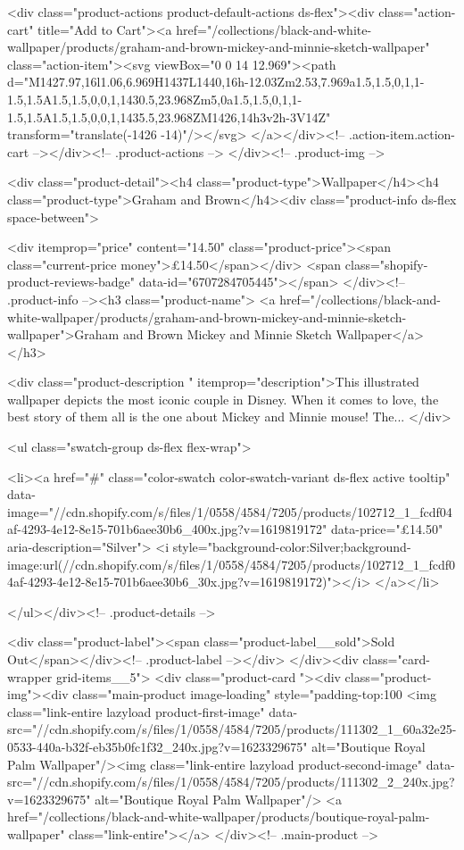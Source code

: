 {{{{{{{<div class="product-actions product-default-actions ds-flex"><div class="action-cart" title="Add to Cart"><a href="/collections/black-and-white-wallpaper/products/graham-and-brown-mickey-and-minnie-sketch-wallpaper" class="action-item"><svg viewBox="0 0 14 12.969"><path d="M1427.97,16l1.06,6.969H1437L1440,16h-12.03Zm2.53,7.969a1.5,1.5,0,1,1-1.5,1.5A1.5,1.5,0,0,1,1430.5,23.968Zm5,0a1.5,1.5,0,1,1-1.5,1.5A1.5,1.5,0,0,1,1435.5,23.968ZM1426,14h3v2h-3V14Z" transform="translate(-1426 -14)"/></svg>
</a></div><!-- .action-item.action-cart --></div><!-- .product-actions -->
</div><!-- .product-img -->

<div class="product-detail"><h4 class="product-type">Wallpaper</h4><h4 class="product-type">Graham and Brown</h4><div class="product-info ds-flex space-between">
    
<div itemprop="price" content="14.50" class="product-price"><span class="current-price money">£14.50</span></div>
    <span class="shopify-product-reviews-badge" data-id="6707284705445"></span>
  </div><!-- .product-info --><h3 class="product-name">
      <a href="/collections/black-and-white-wallpaper/products/graham-and-brown-mickey-and-minnie-sketch-wallpaper">Graham and Brown Mickey and Minnie Sketch Wallpaper</a>
    </h3>
    
<div class="product-description " itemprop="description">This illustrated wallpaper depicts the most iconic couple in Disney. When it comes to love, the best story of them all is the one about Mickey and Minnie mouse! The...
</div>



<ul class="swatch-group ds-flex flex-wrap">
        
<li><a href="#" class="color-swatch color-swatch-variant ds-flex active tooltip" data-image="//cdn.shopify.com/s/files/1/0558/4584/7205/products/102712_1_fcdf04af-4293-4e12-8e15-701b6aee30b6_400x.jpg?v=1619819172" data-price="£14.50" aria-description="Silver">
              <i style="background-color:Silver;background-image:url(//cdn.shopify.com/s/files/1/0558/4584/7205/products/102712_1_fcdf04af-4293-4e12-8e15-701b6aee30b6_30x.jpg?v=1619819172)"></i>
            </a></li>

      </ul></div><!-- .product-details -->

<div class="product-label"><span class="product-label__sold">Sold Out</span></div><!-- .product-label --></div>
          </div><div class="card-wrapper grid-items__5">
            <div class="product-card "><div class="product-img"><div class="main-product image-loading" style="padding-top:100%
      <img class="link-entire lazyload product-first-image" data-src="//cdn.shopify.com/s/files/1/0558/4584/7205/products/111302_1_60a32e25-0533-440a-b32f-eb35b0fc1f32_240x.jpg?v=1623329675" alt="Boutique Royal Palm Wallpaper"/><img class="link-entire lazyload product-second-image" data-src="//cdn.shopify.com/s/files/1/0558/4584/7205/products/111302_2_240x.jpg?v=1623329675" alt="Boutique Royal Palm Wallpaper"/>
      <a href="/collections/black-and-white-wallpaper/products/boutique-royal-palm-wallpaper" class="link-entire"></a>
    </div><!-- .main-product -->
  
}}}}}}}
